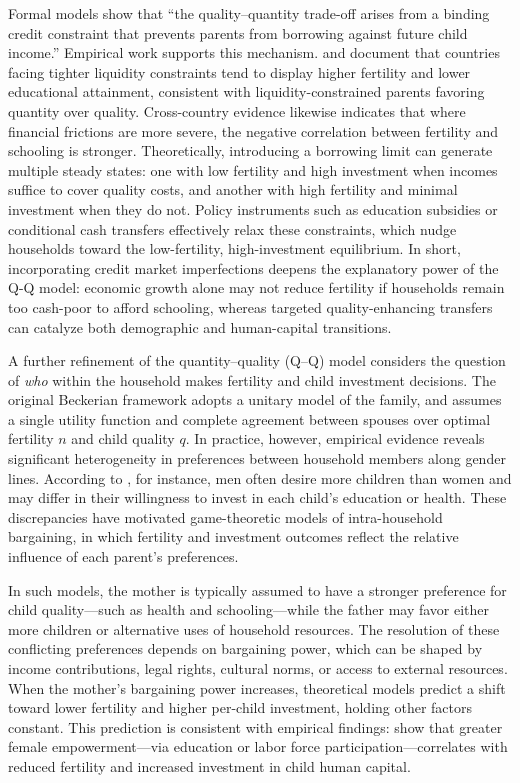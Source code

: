 \documentclass[]{AEA}
\begin{document}
Formal models show that ``the quality--quantity trade-off arises from a
binding credit constraint that prevents parents from borrowing against
future child income.'' Empirical work supports this mechanism.
\citet{kremer2002income} and \citet{de2003inequality} document that
countries facing tighter liquidity constraints tend to display higher
fertility and lower educational attainment, consistent with
liquidity-constrained parents favoring quantity over quality.
Cross-country evidence likewise indicates that where financial frictions
are more severe, the negative correlation between fertility and
schooling is stronger. Theoretically, introducing a borrowing limit can
generate multiple steady states: one with low fertility and high
investment when incomes suffice to cover quality costs, and another with
high fertility and minimal investment when they do not. Policy
instruments such as education subsidies or conditional cash transfers
effectively relax these constraints, which nudge households toward the
low-fertility, high-investment equilibrium. In short, incorporating
credit market imperfections deepens the explanatory power of the Q-Q
model: economic growth alone may not reduce fertility if households
remain too cash-poor to afford schooling, whereas targeted
quality-enhancing transfers can catalyze both demographic and
human-capital transitions.

A further refinement of the quantity--quality (Q--Q) model considers the
question of \emph{who} within the household makes fertility and child
investment decisions. The original Beckerian framework adopts a unitary
model of the family, and assumes a single utility function and complete
agreement between spouses over optimal fertility \(n\) and child quality
\(q\). In practice, however, empirical evidence reveals significant
heterogeneity in preferences between household members along gender
lines. According to \citet{oppenheim1987impact, thomas1990intra}, for
instance, men often desire more children than women and may differ in
their willingness to invest in each child's education or health. These
discrepancies have motivated game-theoretic models of intra-household
bargaining, in which fertility and investment outcomes reflect the
relative influence of each parent's preferences.

In such models, the mother is typically assumed to have a stronger
preference for child quality---such as health and schooling---while the
father may favor either more children or alternative uses of household
resources. The resolution of these conflicting preferences depends on
bargaining power, which can be shaped by income contributions, legal
rights, cultural norms, or access to external resources. When the
mother's bargaining power increases, theoretical models predict a shift
toward lower fertility and higher per-child investment, holding other
factors constant. This prediction is consistent with empirical findings:
\citet{iyigun2007endogenous, doepke2019bargaining} show that greater
female empowerment---via education or labor force
participation---correlates with reduced fertility and increased
investment in child human capital.
\end{document}
